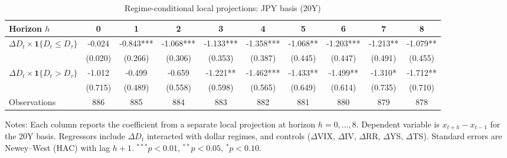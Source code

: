 \begin{table}[!htbp]\centering
\caption{Regime-conditional local projections: JPY basis (20Y)}
\label{tab:lp_jpy_20y}
\begin{tabular}{lccccccccc}
\toprule
Horizon $h$ & 0 & 1 & 2 & 3 & 4 & 5 & 6 & 7 & 8 \\
\midrule
$\Delta D_t \times \mathbf{1}\{D_t \le D_\tau\}$ & -0.024 & -0.843*** & -1.068*** & -1.133*** & -1.358*** & -1.068** & -1.203*** & -1.213** & -1.079** \\
  & (0.020) & (0.266) & (0.306) & (0.353) & (0.387) & (0.445) & (0.447) & (0.491) & (0.455) \\
$\Delta D_t \times \mathbf{1}\{D_t > D_\tau\}$ & -1.012 & -0.499 & -0.659 & -1.221** & -1.462*** & -1.433** & -1.499** & -1.310* & -1.712** \\
  & (0.715) & (0.489) & (0.558) & (0.598) & (0.565) & (0.649) & (0.614) & (0.735) & (0.710) \\
\midrule
Observations & 886 & 885 & 884 & 883 & 882 & 881 & 880 & 879 & 878 \\
\bottomrule
\end{tabular}
\begin{flushleft}\footnotesize Notes: Each column reports the coefficient from a separate local projection at horizon $h=0,\dots,8$. Dependent variable is $x_{t+h}-x_{t-1}$ for the 20Y basis. Regressors include $\Delta D_t$ interacted with dollar regimes, and controls ($\Delta$VIX, $\Delta$IV, $\Delta$RR, $\Delta$YS, $\Delta$TS). Standard errors are Newey--West (HAC) with lag $h+1$. $^{***}p<0.01$, $^{**}p<0.05$, $^{*}p<0.10$.\end{flushleft}
\end{table}